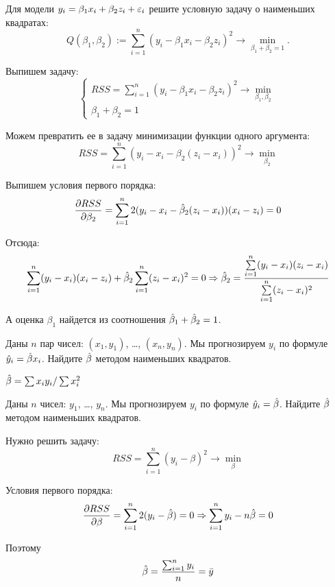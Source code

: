 \begin{problem} %
Для модели $y_i = \beta_1 x_i + \beta_2 z_i + \varepsilon_i$ решите условную задачу о наименьших квадратах:
\[
Q(\beta_1, \beta_2) := \sum_{i=1}^n (y_i - \beta_1 x_i - \beta_2 z_i)^2 \rightarrow \underset{\beta_1 + \beta_2 = 1}{\min}.
\]


\begin{sol}
Выпишем задачу:
\[
\begin{cases}
RSS = \sum\limits_{i=1}^{n}(y_i - \beta_1x_i - \beta_2z_i)^2 \rightarrow \min\limits_{\beta_1, \beta_2}\\
\beta_1 + \beta_2 = 1
\end{cases}
\]

Можем превратить ее в задачу минимизации функции одного аргумента:
\[
RSS =  \sum\limits_{i=1}^{n}(y_i - x_i - \beta_2(z_i-x_i))^2 \rightarrow \min_{\beta_2}
\]

Выпишем условия первого порядка:
\[
\frac{\partial RSS}{\partial \beta_2} = \sum\limits_{i=1}^{n}2(y_i-x_i-\hat{\beta}_2(z_i-x_i))(x_i-z_i)=0
\]

Отсюда:
\[
\sum\limits_{i=1}^{n}(y_i-x_i)(x_i-z_i) + \hat{\beta}_2\sum\limits_{i=1}^{n}(z_i-x_i)^2 = 0 \Rightarrow \hat{\beta}_2 = \frac{\sum\limits_{i=1}^n (y_i-x_i)(z_i-x_i)}{\sum\limits_{i=1}^n (z_i-x_i)^2}
\]

А оценка $\beta_1$ найдется из соотношения $\hat{\beta}_1+\hat{\beta}_2 = 1$.

\end{sol}
\end{problem}




\begin{problem} %
Даны $n$ пар чисел: $(x_1, y_1)$, \ldots, $(x_n,y_n)$. Мы прогнозируем $y_i$ по формуле $\hat{y}_i=\hat{\beta} x_i$. Найдите $\hat{\beta}$ методом наименьших квадратов.


\begin{sol}
$\hat{\beta}=\sum x_i y_i/\sum x_i^2$
\end{sol}
\end{problem}


\begin{problem} %
Даны $n$ чисел: $y_1$, \ldots, $y_n$. Мы прогнозируем $y_i$ по формуле $\hat{y}_i=\hat{\beta}$. Найдите $\hat{\beta}$ методом наименьших квадратов.

\begin{sol}
Нужно решить задачу:
\[
RSS = \sum\limits_{i=1}^n(y_i-\beta)^2 \rightarrow \min\limits_{\beta}
\]

Условия первого порядка:
\[
\frac{\partial RSS}{\partial \beta} = \sum\limits_{i=1}^{n}2(y_i-\hat{\beta}) = 0 \Rightarrow \sum\limits_{i=1}^n y_i-n\hat{\beta} = 0
\]

Поэтому
\[
\hat{\beta} = \frac{\sum_{i=1}^ny_i}{n} = \bar{y}
\]
\end{sol}
\end{problem}



